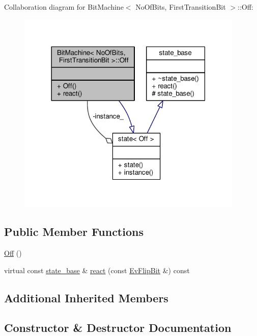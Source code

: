 Collaboration diagram for Bit\+Machine$<$ No\+Of\+Bits, First\+Transition\+Bit $>$\+:\+:Off\+:
\nopagebreak
\begin{figure}[H]
\begin{center}
\leavevmode
\includegraphics[width=306pt]{struct_bit_machine_1_1_off__coll__graph}
\end{center}
\end{figure}
\subsection*{Public Member Functions}
\begin{DoxyCompactItemize}
\item 
\mbox{\hyperlink{struct_bit_machine_1_1_off_a0cc47df16b1ab1593a25ac7ba42191ce}{Off}} ()
\item 
virtual const \mbox{\hyperlink{classstate__base}{state\+\_\+base}} \& \mbox{\hyperlink{struct_bit_machine_1_1_off_ae42704b63f585da48706638ad75ca3fb}{react}} (const \mbox{\hyperlink{struct_ev_flip_bit}{Ev\+Flip\+Bit}} \&) const
\end{DoxyCompactItemize}
\subsection*{Additional Inherited Members}


\subsection{Constructor \& Destructor Documentation}
\mbox{\label{struct_bit_machine_1_1_off_a0cc47df16b1ab1593a25ac7ba42191ce}} 
